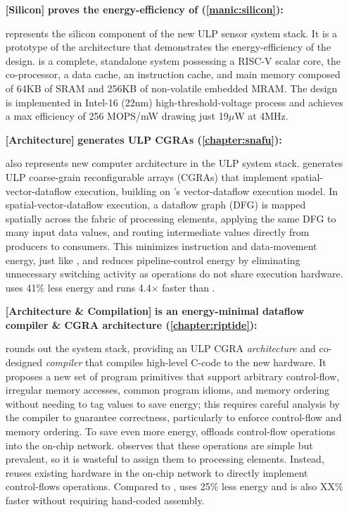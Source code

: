 \begin{itemize}
\item[\textbf{[Silicon]}]
\textbf{\msilicon proves the energy-efficiency of \manic (\autoref{manic:silicon}): }

\msilicon represents the silicon component of the new ULP sensor system stack.
% 
It is a prototype of the \manic architecture that demonstrates the energy-efficiency of the design.
% 
\msilicon is a complete, standalone system possessing a RISC-V scalar core, the \manic co-processor, a data cache, an instruction cache, and main memory composed of 64KB of SRAM and 256KB of non-volatile embedded MRAM.
% 
The design is implemented in Intel-16 (22nm) high-threshold-voltage process and achieves a max efficiency of 256 MOPS/mW drawing just 19$\mu$W at 4MHz.
% 

\item[\textbf{[Architecture]}]
\textbf{\snafu generates ULP CGRAs (\autoref{chapter:snafu}): }

\snafu also represents new computer architecture in the ULP system stack.
% 
\snafu generates ULP coarse-grain reconfigurable arrays (CGRAs) that implement spatial-vector-dataflow execution, building on \manic's vector-dataflow execution model.
% 
% 
In spatial-vector-dataflow execution, a dataflow graph (DFG) is mapped spatially across the fabric of processing elements, applying the same DFG to many input data values, and routing intermediate values directly from producers to consumers.
% 
This minimizes instruction and data-movement energy, just like \manic, and reduces pipeline-control energy by eliminating unnecessary switching activity as operations do not share execution hardware.
% 
\snafu uses 41$\%$ less energy and runs 4.4$\times$ faster than \manic.
% 

\item[\textbf{[Architecture \& Compilation]}]
\textbf{\riptide is an energy-minimal dataflow compiler \& CGRA architecture (\autoref{chapter:riptide}): }

\riptide rounds out the system stack, providing an ULP CGRA \emph{architecture} and co-designed \emph{compiler} that compiles high-level C-code to the new hardware.
% 
It proposes a new set of program primitives that support arbitrary control-flow, irregular memory accesses, common program idioms, and memory ordering without needing to tag values to save energy; this requires careful analysis by the compiler to guarantee correctness, particularly to enforce control-flow and memory ordering.
% 
To save even more energy, \riptide offloads control-flow operations into the on-chip network.
% 
\riptide observes that these operations are simple but prevalent, so it is wasteful to assign them to processing elements.
% 
Instead, \riptide reuses existing hardware in the on-chip network to directly implement control-flows operations.
% 
Compared to \snafu, \riptide uses 25\% less energy and is also XX\% faster without requiring hand-coded assembly.
% 

\end{itemize}

